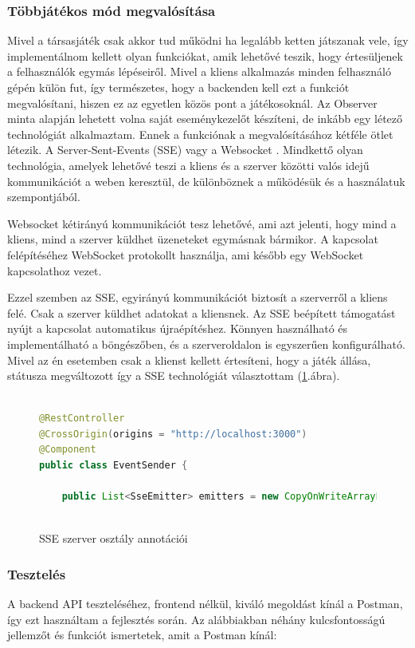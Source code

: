 \documentclass[a4paper,twoside]{article}
\begin{document}
\subsubsection{Többjátékos mód megvalósítása}\label{tobbjatekos}
Mivel a társasjáték csak akkor tud működni ha legalább ketten játszanak vele, így implementálnom kellett olyan funkciókat, amik lehetővé teszik, hogy értesüljenek 
a felhasználók egymás lépéseiről. Mivel a kliens alkalmazás minden felhasználó gépén külön fut, így természetes, hogy a backenden kell ezt a funkciót megvalósítani, hiszen ez az egyetlen közös pont a játékosoknál. Az Observer\cite{obeserver} minta alapján lehetett volna saját eseménykezelőt készíteni, de inkább egy létező technológiát alkalmaztam. Ennek a funkciónak a megvalósításához kétféle ötlet létezik. A Server-Sent-Events (SSE) \cite{sse} vagy a Websocket \cite{websocket}. Mindkettő olyan technológia, amelyek lehetővé teszi a kliens és a szerver közötti valós idejű kommunikációt a weben keresztül, de különböznek a működésük és a használatuk szempontjából.

Websocket kétirányú kommunikációt tesz lehetővé, ami azt jelenti, hogy mind a kliens, mind a szerver küldhet üzeneteket egymásnak bármikor. A kapcsolat felépítéséhez WebSocket protokollt használja, ami később egy WebSocket kapcsolathoz vezet.
 
Ezzel szemben az SSE, egyirányú kommunikációt biztosít a szerverről a kliens felé. Csak a szerver küldhet adatokat a kliensnek. Az SSE beépített támogatást nyújt a kapcsolat automatikus újraépítéshez. Könnyen használható és implementálható a böngészőben, és a szerveroldalon is egyszerűen konfigurálható. Mivel az én esetemben csak a klienst kellett értesíteni, hogy a játék állása, státusza megváltozott így a SSE technológiát választottam (\ref{sse}.ábra). 
\begin{figure}
	\caption{SSE szerver osztály annotációi}
	\centering
	\begin{lstlisting}[language=java,breaklines=true]
		
@RestController
@CrossOrigin(origins = "http://localhost:3000")
@Component
public class EventSender {
		
	public List<SseEmitter> emitters = new CopyOnWriteArrayList<SseEmitter>();
		
	\end{lstlisting}
	\label{sse}
\end{figure} 
\subsubsection{Tesztelés}
A backend API teszteléséhez, frontend nélkül, kiváló megoldást kínál a Post\-man\cite{postman}, így ezt használtam a fejlesztés során. Az alábbiakban néhány kulcsfontosságú jellemzőt és funkciót ismertetek, amit a Postman kínál:
\end{document}
